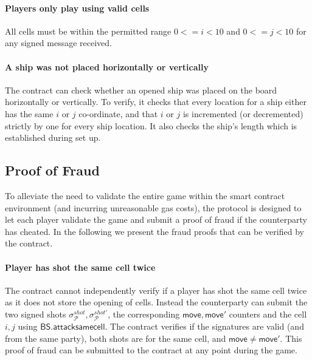 \documentclass{llncs}
\newcommand{\participant}{\mathcal{P}}
\newcommand{\battleshipsamecell}{\mathsf{BS.attacksamecell}}
\begin{document}
\paragraph{Players only play using valid cells}  
All cells must be within the permitted range $0 <= i < 10$ and $0 <= j < 10$ for any signed message received. 

\paragraph{A ship was not placed  horizontally or vertically}\label{sec:vertical}
The contract can check whether an opened ship was placed on the board horizontally or vertically. 
To verify, it checks that every location for a ship either has the same $i$ or $j$ co-ordinate, and that $i$ or $j$ is incremented (or decremented) strictly by one for every ship location. 
It also checks the ship's length which is established during set up. 

\subsection{Proof of Fraud}  \label{sec:prooffraud}

To alleviate the need to validate the entire game within the smart contract environment (and incurring unreasonable gas costs), the protocol is designed to let each player validate the game and submit a proof of fraud if the counterparty has cheated. 
In the following we present the fraud proofs that can be verified by the contract. 

\paragraph{Player has shot the same cell twice} 
The contract cannot independently verify if a player has shot the same cell twice as it does not store the opening of cells.
Instead the counterparty can submit the two signed shots $\sigma^{shot}_{\participant},\sigma^{shot'}_{\participant}$, the corresponding $\mathsf{move},\mathsf{move}'$ counters and the cell $i,j$ using $\battleshipsamecell$. 
The contract verifies if the signatures are valid (and from the same party), both shots are for the same cell, and $\mathsf{move}\neq\mathsf{move}'$. 
This proof of fraud can be submitted to the contract at any point during the game. 
\end{document}
